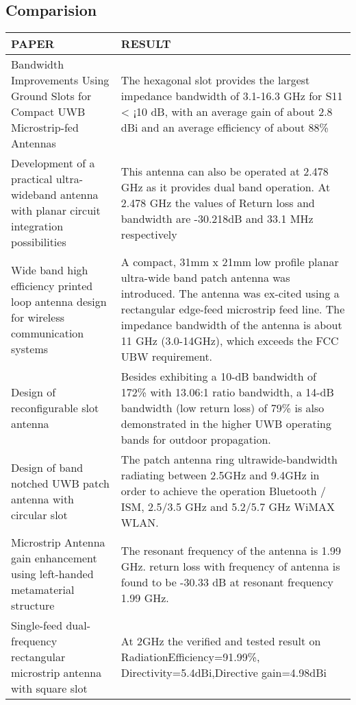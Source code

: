 \documentclass[12pt]{article}
\begin{document}
			\subsection{Comparision}
			 \begin{center}
			 	\begin{table}[H]
			 		\begin{tabular}{ |p{8cm}|p{7cm}|}
			 			\hline                
			 			PAPER & RESULT \\ \hline
			 			
			 			Bandwidth Improvements Using Ground Slots for Compact UWB Microstrip-fed Antennas & The hexagonal slot provides the largest impedance bandwidth of 3.1-16.3 GHz for S11 < ¡10 dB, with an average gain of about 2.8 dBi and an average efficiency of about 88\% \\ \hline
			 			
			 			Development of a practical ultra- wideband antenna with planar circuit integration possibilities & This antenna can also be operated at 2.478 GHz as it provides dual band operation. At 2.478 GHz the values of Return loss and bandwidth are -30.218dB and 33.1 MHz respectively \\ \hline
			 			
			 			Wide band high efficiency printed loop antenna design for wireless communication systems & A compact, 31mm x 21mm low profile planar ultra-wide band patch antenna was introduced. The antenna was ex-cited using a rectangular edge-feed microstrip feed line. The impedance bandwidth of the antenna is about 11 GHz (3.0-14GHz), which exceeds the FCC UBW requirement. \\ \hline
			 			
			 			Design of reconfigurable slot antenna & Besides exhibiting a 10-dB bandwidth of 172\% with 13.06:1 ratio bandwidth, a 14-dB bandwidth (low return loss) of 79\% is also demonstrated in the higher UWB operating bands for outdoor propagation.\\ \hline
			 			
			 			Design of band notched UWB patch antenna with circular slot  & The patch antenna ring ultrawide-bandwidth radiating between 2.5GHz and 9.4GHz in order to achieve the
			 			operation Bluetooth / ISM, 2.5/3.5 GHz and 5.2/5.7 GHz WiMAX WLAN. \\ \hline 
			 			
			 			Microstrip Antenna gain enhancement using left-handed metamaterial structure & The resonant frequency of the antenna is 1.99 GHz.
			 			return loss with frequency of antenna is found to be -30.33 dB at resonant frequency 1.99 GHz. \\ \hline
			 			
			 			Single-feed dual-frequency rectangular microstrip antenna with square slot &  At 2GHz the verified and tested result on RadiationEfficiency=91.99\%, Directivity=5.4dBi,Directive gain=4.98dBi \\ \hline
			 			
			 			
			 			
			 		\end{tabular}
			 	\end{table}
			 \end{center}	    	
\end{document}

